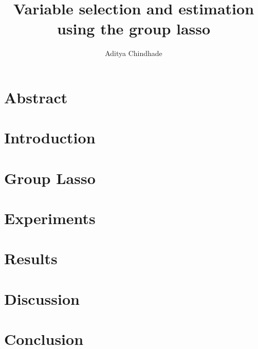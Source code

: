 \documentclass[a4paper,12pt]{article}
\title{Variable selection and estimation using the group lasso}
\date{}
\author{Aditya Chindhade}
\begin{document}
	\maketitle

	\newpage
	\tableofcontents
	
	\newpage
	\section{Abstract}
	
	\newpage
	\section{Introduction}
	\cite{yuan2006model}

	\newpage
	\section{Group Lasso}

	\newpage
	\section{Experiments}

	\newpage
	\section{Results}

	\newpage
	\section{Discussion}

	\newpage
	\section{Conclusion}
	
	\newpage
	
	
\end{document}
